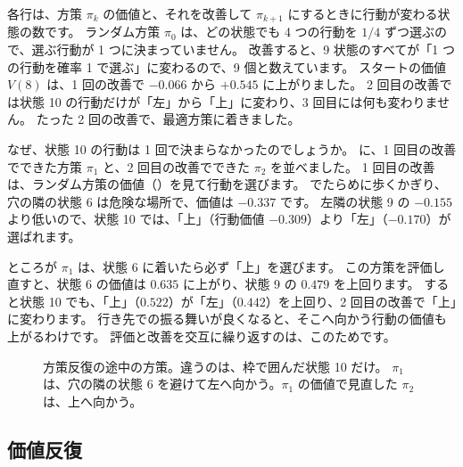 
各行は、方策 $\pi_k$ の価値と、それを改善して $\pi_{k+1}$ にするときに行動が変わる状態の数です。
ランダム方策 $\pi_0$ は、どの状態でも 4 つの行動を $1/4$ ずつ選ぶので、選ぶ行動が 1 つに決まっていません。
改善すると、9 状態のすべてが「1 つの行動を確率 1 で選ぶ」に変わるので、9 個と数えています。
スタートの価値 $V(8)$ は、1 回の改善で $-0.066$ から $+0.545$ に上がりました。
2 回目の改善では状態 10 の行動だけが「左」から「上」に変わり、3 回目には何も変わりません。
たった 2 回の改善で、最適方策に着きました。

なぜ、状態 10 の行動は 1 回で決まらなかったのでしょうか。
に、1 回目の改善でできた方策 $\pi_1$ と、2 回目の改善でできた $\pi_2$ を並べました。
1 回目の改善は、ランダム方策の価値（）を見て行動を選びます。
でたらめに歩くかぎり、穴の隣の状態 6 は危険な場所で、価値は $-0.337$ です。
左隣の状態 9 の $-0.155$ より低いので、状態 10 では、「上」（行動価値 $-0.309$）より「左」（$-0.170$）が選ばれます。

ところが $\pi_1$ は、状態 6 に着いたら必ず「上」を選びます。
この方策を評価し直すと、状態 6 の価値は $0.635$ に上がり、状態 9 の $0.479$ を上回ります。
すると状態 10 でも、「上」（$0.522$）が「左」（$0.442$）を上回り、2 回目の改善で「上」に変わります。
行き先での振る舞いが良くなると、そこへ向かう行動の価値も上がるわけです。
評価と改善を交互に繰り返すのは、このためです。

\begin{figure}[tbp]
\centering
{}
\caption{方策反復の途中の方策。違うのは、枠で囲んだ状態 10 だけ。
$\pi_1$ は、穴の隣の状態 6 を避けて左へ向かう。$\pi_1$ の価値で見直した $\pi_2$ は、上へ向かう。}
\label{fig:rlb-pi-improve}
\end{figure}

\subsection*{価値反復}


